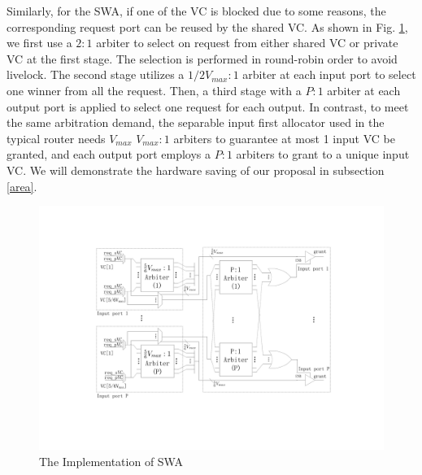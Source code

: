 \documentclass[10pt,conference]{IEEEtran}
\begin{document}
Similarly, for the SWA, if one of the VC is blocked due to some reasons, the corresponding request port can be reused by the shared VC. As shown in Fig. \ref{swallocator}, we first use a $2:1$ arbiter to select on request from either shared VC or private VC at the first stage. The selection is performed in round-robin order to avoid livelock. The second stage utilizes a $1/2V_{max}:1$ arbiter at each input port to select one winner from all the request. Then, a third stage with a $P:1$ arbiter at each output port is applied to select one request for each output. In contrast, to meet the same arbitration demand, the separable input first allocator used in the typical router needs $V_{max}$ $V_{max}:1$ arbiters to guarantee at most 1 input VC be granted, and each output port employs a $P:1$ arbiters to grant to a unique input VC. We will demonstrate the hardware saving of our proposal in subsection \ref{area}.

\begin{figure}
\centering\includegraphics[scale=0.3]{figures/swalloc.pdf}
\caption{The Implementation of SWA}\label{swallocator}
\end{figure}
\end{document}
